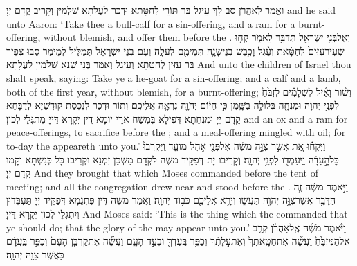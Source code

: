 {וַאֲמַר לְאַהֲרֹן סַב לָךְ עֵיגַל בַּר תּוֹרֵי לְחַטָּתָא וּדְכַר לַעֲלָתָא שַׁלְמִין וְקָרֵיב קֳדָם יְיָ׃}
{and he said unto Aaron: ‘Take thee a bull-calf for a sin-offering, and a ram for a burnt-offering, without blemish, and offer them before the \lord.}{}
{וְאֶל\maqqaf בְּנֵ֥י יִשְׂרָאֵ֖ל תְּדַבֵּ֣ר לֵאמֹ֑ר קְח֤וּ שְׂעִיר\maqqaf עִזִּים֙ לְחַטָּ֔את וְעֵ֨גֶל וָכֶ֧בֶשׂ בְּנֵי\maqqaf שָׁנָ֛ה תְּמִימִ֖ם לְעֹלָֽה׃}
{וְעִם בְּנֵי יִשְׂרָאֵל תְּמַלֵּיל לְמֵימַר סַבוּ צְפִיר בַּר עִזִּין לְחַטָּתָא וְעֵיגַל וְאִמַּר בְּנֵי שְׁנָא שַׁלְמִין לַעֲלָתָא׃}
{And unto the children of Israel thou shalt speak, saying: Take ye a he-goat for a sin-offering; and a calf and a lamb, both of the first year, without blemish, for a burnt-offering;}{}
{וְשׁ֨וֹר וָאַ֜יִל לִשְׁלָמִ֗ים לִזְבֹּ֙חַ֙ לִפְנֵ֣י יְהֹוָ֔ה וּמִנְחָ֖ה בְּלוּלָ֣ה בַשָּׁ֑מֶן כִּ֣י הַיּ֔וֹם יְהֹוָ֖ה נִרְאָ֥ה אֲלֵיכֶֽם׃}
{וְתוֹר וּדְכַר לְנִכְסַת קוּדְשַׁיָּא לְדַבָּחָא קֳדָם יְיָ וּמִנְחָתָא דְּפִילָא בִּמְשַׁח אֲרֵי יוֹמָא דֵין יְקָרָא דַּייָ מִתְגְּלֵי לְכוֹן׃}
{and an ox and a ram for peace-offerings, to sacrifice before the \lord; and a meal-offering mingled with oil; for to-day the \lord\space appeareth unto you.’}{}
{וַיִּקְח֗וּ אֵ֚ת אֲשֶׁ֣ר צִוָּ֣ה מֹשֶׁ֔ה אֶל\maqqaf פְּנֵ֖י אֹ֣הֶל מוֹעֵ֑ד וַֽיִּקְרְבוּ֙ כׇּל\maqqaf הָ֣עֵדָ֔ה וַיַּֽעַמְד֖וּ לִפְנֵ֥י יְהֹוָֽה׃}
{וְקָרִיבוּ יָת דְּפַקֵּיד מֹשֶׁה לִקְדָם מַשְׁכַּן זִמְנָא וּקְרִיבוּ כָּל כְּנִשְׁתָּא וְקָמוּ קֳדָם יְיָ׃}
{And they brought that which Moses commanded before the tent of meeting; and all the congregation drew near and stood before the \lord.}{}
{וַיֹּ֣אמֶר מֹשֶׁ֔ה זֶ֧ה הַדָּבָ֛ר אֲשֶׁר\maqqaf צִוָּ֥ה יְהֹוָ֖ה תַּעֲשׂ֑וּ וְיֵרָ֥א אֲלֵיכֶ֖ם כְּב֥וֹד יְהֹוָֽה׃}
{וַאֲמַר מֹשֶׁה דֵּין פִּתְגָמָא דְּפַקֵּיד יְיָ תַּעְבְּדוּן וְיִתְגְּלֵי לְכוֹן יְקָרָא דַּייָ׃}
{And Moses said: ‘This is the thing which the \lord\space commanded that ye should do; that the glory of the \lord\space may appear unto you.’}{}
{וַיֹּ֨אמֶר מֹשֶׁ֜ה אֶֽל\maqqaf אַהֲרֹ֗ן קְרַ֤ב אֶל\maqqaf הַמִּזְבֵּ֙חַ֙ וַעֲשֵׂ֞ה אֶת\maqqaf חַטָּֽאתְךָ֙ וְאֶת\maqqaf עֹ֣לָתֶ֔ךָ וְכַפֵּ֥ר בַּֽעַדְךָ֖ וּבְעַ֣ד הָעָ֑ם וַעֲשֵׂ֞ה אֶת\maqqaf קׇרְבַּ֤ן הָעָם֙ וְכַפֵּ֣ר בַּֽעֲדָ֔ם כַּאֲשֶׁ֖ר צִוָּ֥ה יְהֹוָֽה׃}
